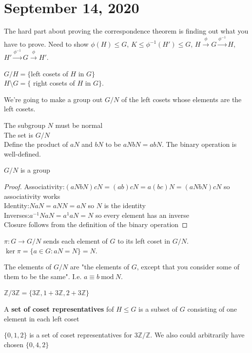 \documentclass{article}
\newcommand{\vocab}[1]{\textbf{\color{blue!90}\boldmath #1}}
\newcommand{\Z}{\mathbb{Z}}
\renewcommand{\mod}[1]{\ \text{mod}\ #1}
\newcommand{\ra}[1][]{\xrightarrow{#1}}
\begin{document}
\section{September 14, 2020}
The hard part about proving the correspondence theorem is finding out what you have to prove. Need to show $\phi(H)\leq G$, $K\leq\phi^{-1}(H')\leq G$, $H\ra[\phi]G\ra[\phi^{-1}]H$, $H'\ra[\phi^{-1}]G\ra[\phi]H'$.
\begin{definition}
    $G/H=\{$left cosets of $H$ in $G\}$\\
    $H$\textbackslash $G=\{$ right cosets of $H$ in $G\}$.
\end{definition}
We're going to make a group out $G/N$ of the left cosets whose elements are the left cosets.
\begin{definition}
The subgroup $N$ must be normal\\
The set is $G/N$\\
Define the product of $aN$ and $bN$ to be $aNbN=abN$. The binary operation is well-defined.
\end{definition}
\begin{theorem}
$G/N$ is a group
\end{theorem}
\begin{proof}
Associativity:$(aNbN)cN=(ab)cN=a(bc)N=(aNbN)cN$ so associativity works\\
Identity:$NaN=aNN=aN$ so $N$ is the identity\\
Inverses:$a^{-1}NaN=a^{1}aN=N$ so every element has an inverse\\
Closure follows from the definition of the binary operation
\end{proof}
\begin{definition}
$\pi:G\ra G/N$ sends each element of $G$ to its left coset in $G/N$.\\
$\ker\pi=\{a\in G:aN=N\}=N$.
\end{definition}
\begin{fact}
The elements of $G/N$ are "the elements of $G$, except that you consider some of them to be the same". I.e. $a\equiv b \mod{N}$.
\end{fact}
\begin{example}
$\Z/3\Z=\{3\Z,1+3\Z,2+3\Z\}$
\end{example}
\begin{definition}
A \vocab{set of coset representatives} fof $H\leq G$ is a subset of $G$ consisting of one element in each left coset
\end{definition}
\begin{example}
$\{0,1,2\}$ is a set of coset representatives for $3\Z/\Z$. We also could arbitrarily have chosen $\{0,4,2\}$
\end{example}
\end{document}

